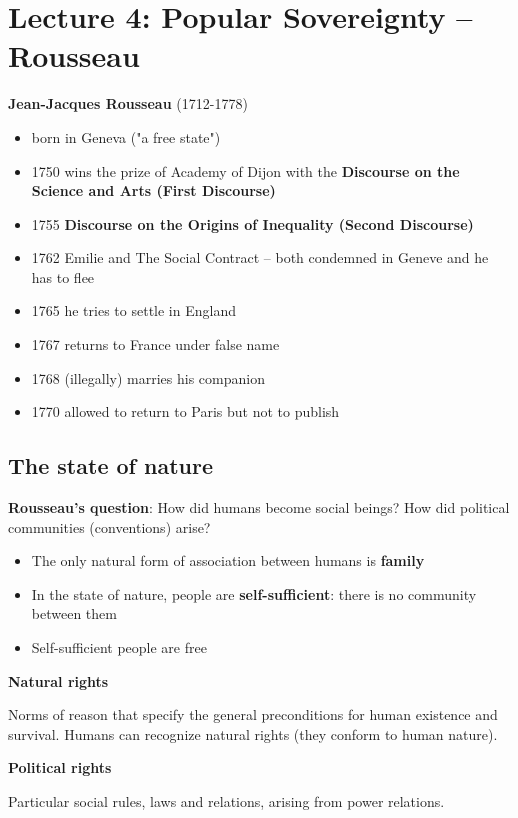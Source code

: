 \section{Lecture 4: Popular Sovereignty -- Rousseau}

\textbf{Jean-Jacques Rousseau} (1712-1778)

\begin{itemize}
	\item born in Geneva ("a free state")
	\item 1750 wins the prize of Academy of Dijon with the
	\textbf{Discourse on the Science and Arts (First Discourse)}
	\item 1755 \textbf{Discourse on the Origins of Inequality (Second
	Discourse)}
	\item 1762 Emilie and The Social Contract -- both condemned in Geneve
	and he has to flee
	\item 1765 he tries to settle in England
	\item 1767 returns to France under false name
	\item 1768 (illegally) marries his companion
	\item 1770 allowed to return to Paris but not to publish
\end{itemize}

\subsection{The state of nature}

\textbf{Rousseau's question}: How did humans become social beings? How did
political communities (conventions) arise?


\begin{itemize}
	\item The only natural form of association between humans is
	\textbf{family}
	\item In the state of nature, people are \textbf{self-sufficient}:
	there is no community between them
	\item Self-sufficient people are free
\end{itemize}

\textbf{Natural rights}

Norms of reason that specify the general preconditions for human existence
and survival. Humans can recognize natural rights (they conform to human
nature).

\textbf{Political rights}

Particular social rules, laws and relations, arising from power relations.

